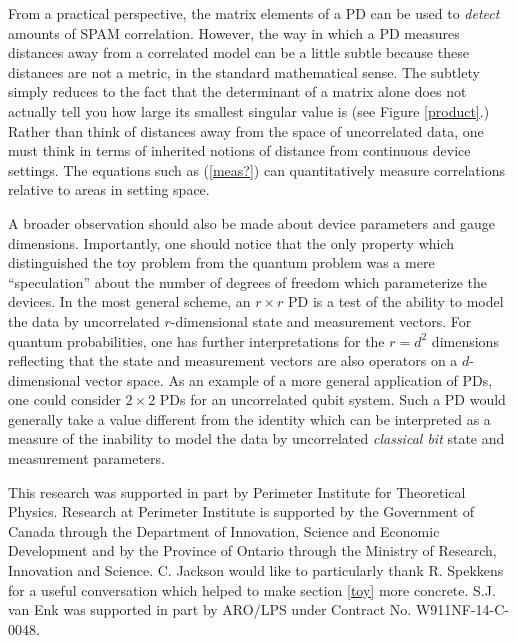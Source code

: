 \documentclass[pra, 10pt, notitlepage, twocolumn]{revtex4-1}
\newcommand{\pref}[1]{(\ref{#1})}
\begin{document}
From a practical perspective, the matrix elements of a PD can be used to \emph{detect} amounts of SPAM correlation.
However, the way in which a PD measures distances away from a correlated model can be a little subtle because these distances are not a metric, in the standard mathematical sense.
The subtlety simply reduces to the fact that the determinant of a matrix alone does not actually tell you how large its smallest singular value is (see Figure \ref{product}.)
Rather than think of distances away from the space of uncorrelated data, one must think in terms of inherited notions of distance from continuous device settings.
The equations such as \pref{meas?} can quantitatively measure correlations relative to areas in setting space.

A broader observation should also be made about device parameters and gauge dimensions.
Importantly, one should notice that the only property which distinguished the toy problem from the quantum problem
was a mere ``speculation'' about the number of degrees of freedom which parameterize the devices.
In the most general scheme, an $r \times r$ PD is a test of the ability to model the data by uncorrelated $r$-dimensional state and measurement vectors.
For quantum probabilities, one has further interpretations for the $r=d^2$ dimensions
reflecting that the state and measurement vectors are also operators on a $d$-dimensional vector space.
As an example of a more general application of PDs, one could consider $2\times2$ PDs for an uncorrelated qubit system.
Such a PD would generally take a value different from the identity which can be interpreted as a measure of the inability to model the data by uncorrelated \emph{classical bit} state and measurement parameters.




\begin{acknowledgments}
This research was supported in part by Perimeter Institute for Theoretical Physics.
Research at Perimeter Institute is supported by the Government of Canada through the Department of Innovation, Science and Economic Development
and by the Province of Ontario through the Ministry of Research, Innovation and Science.
C. Jackson would like to particularly thank R. Spekkens for a useful conversation which helped to make section \ref{toy} more concrete.
S.J. van Enk was supported in part by ARO/LPS under Contract No. W911NF-14-C-0048.
\end{acknowledgments}













\end{document}
